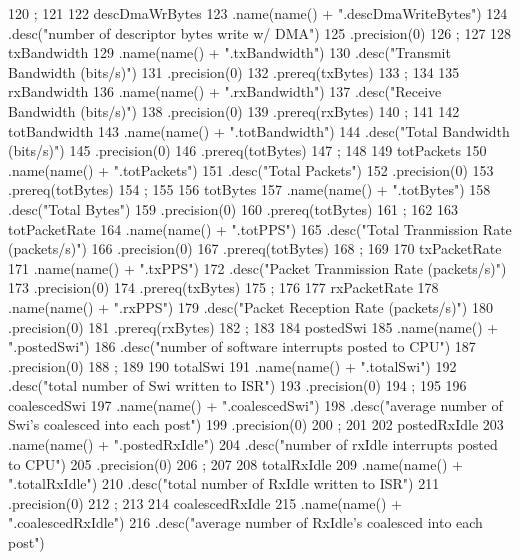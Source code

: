 \begin{DoxyCode}
{120         ;
121 
122     descDmaWrBytes
123         .name(name() + ".descDmaWriteBytes")
124         .desc("number of descriptor bytes write w/ DMA")
125         .precision(0)
126         ;
127 
128     txBandwidth
129         .name(name() + ".txBandwidth")
130         .desc("Transmit Bandwidth (bits/s)")
131         .precision(0)
132         .prereq(txBytes)
133         ;
134 
135     rxBandwidth
136         .name(name() + ".rxBandwidth")
137         .desc("Receive Bandwidth (bits/s)")
138         .precision(0)
139         .prereq(rxBytes)
140         ;
141 
142     totBandwidth
143         .name(name() + ".totBandwidth")
144         .desc("Total Bandwidth (bits/s)")
145         .precision(0)
146         .prereq(totBytes)
147         ;
148 
149     totPackets
150         .name(name() + ".totPackets")
151         .desc("Total Packets")
152         .precision(0)
153         .prereq(totBytes)
154         ;
155 
156     totBytes
157         .name(name() + ".totBytes")
158         .desc("Total Bytes")
159         .precision(0)
160         .prereq(totBytes)
161         ;
162 
163     totPacketRate
164         .name(name() + ".totPPS")
165         .desc("Total Tranmission Rate (packets/s)")
166         .precision(0)
167         .prereq(totBytes)
168         ;
169 
170     txPacketRate
171         .name(name() + ".txPPS")
172         .desc("Packet Tranmission Rate (packets/s)")
173         .precision(0)
174         .prereq(txBytes)
175         ;
176 
177     rxPacketRate
178         .name(name() + ".rxPPS")
179         .desc("Packet Reception Rate (packets/s)")
180         .precision(0)
181         .prereq(rxBytes)
182         ;
183 
184     postedSwi
185         .name(name() + ".postedSwi")
186         .desc("number of software interrupts posted to CPU")
187         .precision(0)
188         ;
189 
190     totalSwi
191         .name(name() + ".totalSwi")
192         .desc("total number of Swi written to ISR")
193         .precision(0)
194         ;
195 
196     coalescedSwi
197         .name(name() + ".coalescedSwi")
198         .desc("average number of Swi's coalesced into each post")
199         .precision(0)
200         ;
201 
202     postedRxIdle
203         .name(name() + ".postedRxIdle")
204         .desc("number of rxIdle interrupts posted to CPU")
205         .precision(0)
206         ;
207 
208     totalRxIdle
209         .name(name() + ".totalRxIdle")
210         .desc("total number of RxIdle written to ISR")
211         .precision(0)
212         ;
213 
214     coalescedRxIdle
215         .name(name() + ".coalescedRxIdle")
216         .desc("average number of RxIdle's coalesced into each post")
}
\end{DoxyCode}
